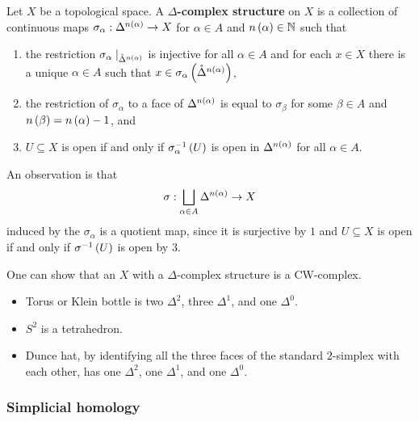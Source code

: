 \begin{definition*}
Let $ X $ be a topological space. A \textbf{$ \Delta $-complex structure} on $ X $ is a collection of continuous maps $ \sigma_\alpha : \Delta^{n\left( \alpha \right)} \to X $ for $ \alpha \in A $ and $ n\left( \alpha \right) \in \mathbb{N} $ such that
\begin{enumerate}
\item the restriction $ \sigma_\alpha \mid_{\mathring{\Delta}^{n\left( \alpha \right)}} $ is injective for all $ \alpha \in A $ and for each $ x \in X $ there is a unique $ \alpha \in A $ such that $ x \in \sigma_\alpha\left( \mathring{\Delta}^{n\left( \alpha \right)} \right) $,
\item the restriction of $ \sigma_\alpha $ to a face of $ \Delta^{n\left( \alpha \right)} $ is equal to $ \sigma_\beta $ for some $ \beta \in A $ and $ n\left( \beta \right) = n\left( \alpha \right) - 1 $, and
\item $ U \subseteq X $ is open if and only if $ \sigma_\alpha^{-1}\left( U \right) $ is open in $ \Delta^{n\left( \alpha \right)} $ for all $ \alpha \in A $.
\end{enumerate}
\end{definition*}

An observation is that
$$ \sigma : \bigsqcup_{\alpha \in A} \Delta^{n\left( \alpha \right)} \to X $$
induced by the $ \sigma_\alpha $ is a quotient map, since it is surjective by $ 1 $ and $ U \subseteq X $ is open if and only if $ \sigma^{-1}\left( U \right) $ is open by $ 3 $.

\begin{remark*}
One can show that an $ X $ with a $ \Delta $-complex structure is a CW-complex.
\end{remark*}

\begin{example*}
\hfill
\begin{itemize}
\item Torus or Klein bottle is two $ \Delta^2 $, three $ \Delta^1 $, and one $ \Delta^0 $.
\item $ S^2 $ is a tetrahedron.
\item Dunce hat, by identifying all the three faces of the standard $ 2 $-simplex with each other, has one $ \Delta^2 $, one $ \Delta^1 $, and one $ \Delta^0 $.
\end{itemize}
\end{example*}

\subsubsection{Simplicial homology}

